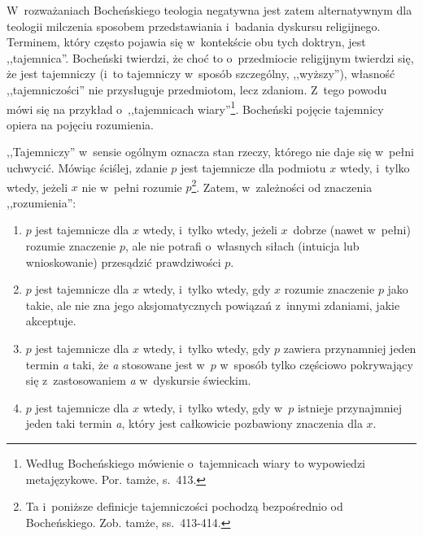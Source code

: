 W~rozważaniach Bocheńskiego teologia negatywna jest zatem alternatywnym dla teologii milczenia sposobem przedstawiania i~badania dyskursu religijnego. Terminem, który często pojawia się w~kontekście obu tych doktryn, jest ,,tajemnica''. Bocheński twierdzi, że choć to o~przedmiocie religijnym twierdzi się, że jest tajemniczy (i~to tajemniczy w~sposób szczególny, ,,wyższy''), własność ,,tajemniczości'' nie przysługuje przedmiotom, lecz zdaniom. Z~tego powodu mówi się na przykład o~,,tajemnicach wiary''\footnote{Według Bocheńskiego mówienie o~tajemnicach wiary to wypowiedzi metajęzykowe. Por. tamże, s.~413.}. Bocheński pojęcie tajemnicy opiera na pojęciu rozumienia.

\begin{defin}[Tajemnica]
,,Tajemniczy'' w~sensie ogólnym oznacza stan rzeczy, którego nie daje się w~pełni uchwycić. Mówiąc ściślej, zdanie $p$ jest tajemnicze dla podmiotu $x$ wtedy, i~tylko wtedy, jeżeli $x$ nie w~pełni rozumie $p$\footnote{Ta i~poniższe definicje tajemniczości pochodzą bezpośrednio od Bocheńskiego. Zob. tamże, ss.~413-414.}. Zatem, w~zależności od znaczenia ,,rozumienia'':

\begin{enumerate}[label = (\arabic*)]
\item $p$ jest tajemnicze dla $x$ wtedy, i~tylko wtedy, jeżeli $x$~dobrze (nawet w~pełni) rozumie znaczenie $p$, ale nie potrafi o~własnych siłach (intuicja lub wnioskowanie) przesądzić prawdziwości $p$.
\item $p$ jest tajemnicze dla $x$ wtedy, i~tylko wtedy, gdy $x$ rozumie znaczenie $p$ jako takie, ale nie zna jego aksjomatycznych powiązań z~innymi zdaniami, jakie akceptuje.
\item $p$ jest tajemnicze dla $x$ wtedy, i~tylko wtedy, gdy $p$ zawiera przynamniej jeden termin \textit{a} taki, że \textit{a} stosowane jest w~$p$ w~sposób tylko częściowo pokrywający się z~zastosowaniem \textit{a} w~dyskursie świeckim.
\item $p$ jest tajemnicze dla $x$ wtedy, i~tylko wtedy, gdy w~$p$ istnieje przynajmniej jeden taki termin \textit{a}, który jest całkowicie pozbawiony znaczenia dla $x$.
\end{enumerate}
\end{defin}

